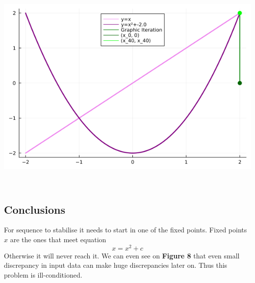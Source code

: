 \documentclass[11pt]{article}
\begin{document}
\begin{minipage}{0.49\linewidth}
    \includegraphics[scale=0.7]{"ex6/c=-2.0_x0=2.0"} 
\end{minipage}\\
\subsection{Conclusions}
For sequence to stabilise it needs to start in one of the fixed points. Fixed points $x$ are the ones that meet equation
$$x = x^2 + c$$
Otherwise it will never reach it.
We can even see on \textbf{Figure 8} that even small discrepancy in input data can make huge discrepancies later on.
Thus this problem is ill-conditioned.
\end{document}
